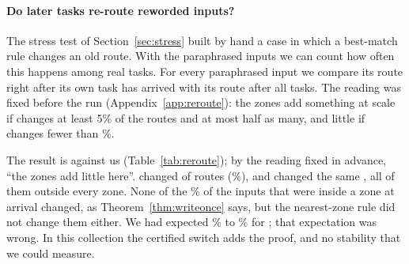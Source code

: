 \begin{table}[t]
  \caption{The check on Spanish-pivot paraphrases: \cert{} and the encoder setting (paraphrase ruler,
  $\alpha = 0.2$) on the three pivots, \WidenSpInputs{} paraphrased inputs each; nothing was fitted again for Spanish. ``Encoder'': the sentence encoder with the paraphrase ruler at $\alpha = 0.2$. In \%.}
  \label{tab:widenspanish}
  \centering
  \footnotesize
  \setlength{\tabcolsep}{3pt}
  
\end{table}

\begin{table}[t]
  \caption{The same two rules on \WidenSplitCount{} other random splits of the \WidenTasksAll{} tasks, Spanish pivot: mean (smallest to largest), with
  ruler and radius fitted again on each split. In \%.}
  \label{tab:widensplits}
  \centering
  \footnotesize
  
\end{table}

\paragraph{Do later tasks re-route reworded inputs?} The stress test of Section~\ref{sec:stress} built by hand a case in which a best-match rule
changes an old route. With the paraphrased inputs we can count how often this happens among real tasks. For every paraphrased input we compare its route
right after its own task has arrived with its route after all \WidenTasksEval{} tasks. The reading was fixed before the run (Appendix~\ref{app:reroute}): the zones
add something at scale if \nearest{} changes at least 5\% of the routes and \cert{} at most half as many, and little if \nearest{} changes fewer than \RerouteLimitLow{}\%.

The result is against us (Table~\ref{tab:reroute}); by the reading fixed in advance, ``the zones add little here''. \nearest{} changed \RerouteNearNChanged{} of \RerouteInputs{} routes (\RerouteNearChanged{}\%), and \cert{} changed the same
\RerouteCertNChanged{}, all of them outside every zone. None of the \RerouteCertInZone{}\% of the inputs that were inside a zone at arrival changed, as Theorem~\ref{thm:writeonce} says, but
the nearest-zone rule did not change them either. We had expected \RerouteExpectNearLow{}\% to \RerouteExpectNearHigh{}\% for \nearest{}; that expectation was wrong. In this collection the certified switch adds
the proof, and no stability that we could measure.

